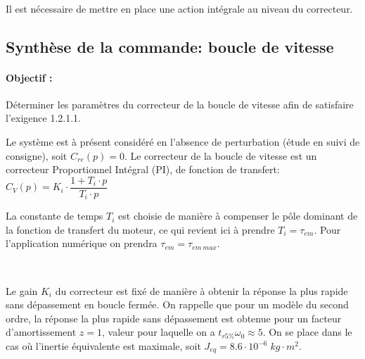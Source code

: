 
~\

Il est nécessaire de mettre en place une action intégrale au niveau du correcteur.

\subsection{Synthèse de la commande: boucle de vitesse}

\paragraph{Objectif :} Déterminer les paramètres du correcteur de la boucle de vitesse afin de satisfaire l'exigence 1.2.1.1. 

Le système est à présent considéré en l'absence de perturbation (étude en suivi de consigne), soit $C_{re}(p)=0$. Le correcteur de la boucle de vitesse est un correcteur Proportionnel Intégral (PI), de fonction de transfert:
$C_V(p)=K_i\cdot \dfrac{1+T_i\cdot p}{T_i\cdot p}$

La constante de temps $T_i$ est choisie de manière à compenser le pôle dominant de la fonction de transfert du moteur, ce qui revient ici à prendre $T_i=\tau_{em}$. Pour l'application numérique on prendra $\tau_{em}=\tau_{em\ max}$.


~\

Le gain $K_i$ du correcteur est fixé de manière à obtenir la réponse la plus rapide sans dépassement en boucle fermée. On rappelle que pour un modèle du second ordre, la réponse la plus rapide sans dépassement est obtenue pour un facteur d'amortissement $z=1$, valeur pour laquelle on a $t_{r5\%}\omega_0 \approx 5$. On se place dans le cas où l'inertie équivalente est maximale, soit $J_{eq}=8.6 \cdot 10^{-6}\;kg \cdot m^2$.


